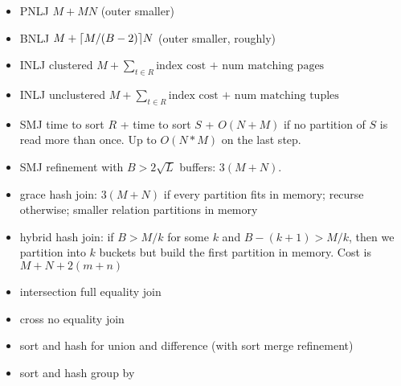 \documentclass{article}
\DeclarePairedDelimiter{\ceil}{\lceil}{\rceil}
\begin{document}
\begin{itemize}
  \item PNLJ $M + M N$ (outer smaller)
  \item BNLJ $M + \ceil{M/(B-2)}N$ (outer smaller, roughly)
  \item INLJ clustered $M + \sum_{t \in R} \text{index cost + num matching pages}$
  \item INLJ unclustered $M + \sum_{t \in R} \text{index cost + num matching tuples}$
  \item SMJ time to sort $R$ + time to sort $S$ + $O(N + M)$ if no partition of $S$ is read more than once. Up to $O(N*M)$ on the last step.
  \item SMJ refinement with $B > 2\sqrt{L}$ buffers: $3(M + N)$.
  \item grace hash join: $3(M + N)$ if every partition fits in memory; recurse otherwise; smaller relation partitions in memory
  \item hybrid hash join: if $B > M/k$ for some $k$ and $B - (k + 1) > M/k$, then we partition into $k$ buckets but build the first partition in memory. Cost is $M + N + 2(m + n)$
  \item intersection full equality join
  \item cross no equality join
  \item sort and hash for union and difference (with sort merge refinement)
  \item sort and hash group by
\end{itemize}
\end{document}
